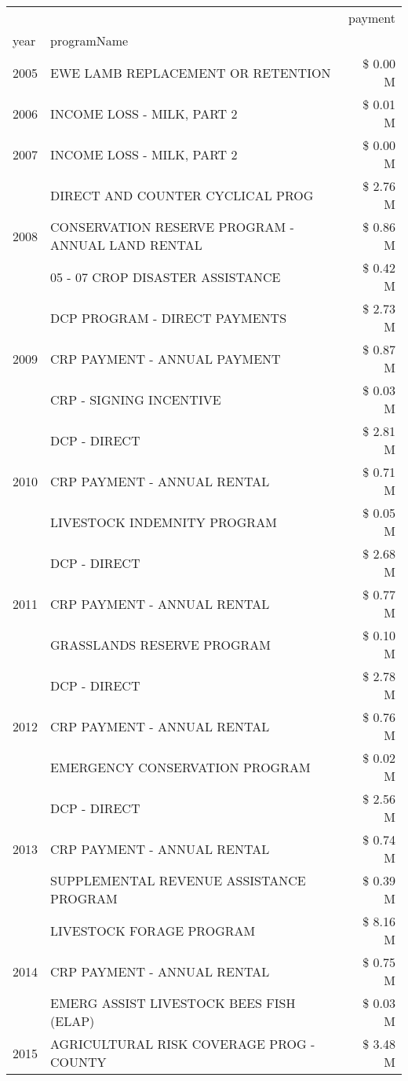 \begin{tabular}{llr}
\toprule
 &  & payment \\
year & programName &  \\
\midrule
2005 & EWE LAMB REPLACEMENT OR RETENTION & \$ 0.00 M \\
\cline{1-3}
2006 & INCOME LOSS - MILK, PART 2 & \$ 0.01 M \\
\cline{1-3}
2007 & INCOME LOSS - MILK, PART 2 & \$ 0.00 M \\
\cline{1-3}
\multirow[t]{3}{*}{2008} & DIRECT AND COUNTER CYCLICAL PROG & \$ 2.76 M \\
 & CONSERVATION RESERVE PROGRAM - ANNUAL LAND RENTAL & \$ 0.86 M \\
 & 05 - 07 CROP DISASTER ASSISTANCE & \$ 0.42 M \\
\cline{1-3}
\multirow[t]{3}{*}{2009} & DCP PROGRAM - DIRECT PAYMENTS & \$ 2.73 M \\
 & CRP PAYMENT - ANNUAL PAYMENT & \$ 0.87 M \\
 & CRP - SIGNING INCENTIVE & \$ 0.03 M \\
\cline{1-3}
\multirow[t]{3}{*}{2010} & DCP - DIRECT & \$ 2.81 M \\
 & CRP PAYMENT - ANNUAL RENTAL & \$ 0.71 M \\
 & LIVESTOCK INDEMNITY PROGRAM & \$ 0.05 M \\
\cline{1-3}
\multirow[t]{3}{*}{2011} & DCP - DIRECT & \$ 2.68 M \\
 & CRP PAYMENT - ANNUAL RENTAL & \$ 0.77 M \\
 & GRASSLANDS RESERVE PROGRAM & \$ 0.10 M \\
\cline{1-3}
\multirow[t]{3}{*}{2012} & DCP - DIRECT & \$ 2.78 M \\
 & CRP PAYMENT - ANNUAL RENTAL & \$ 0.76 M \\
 & EMERGENCY CONSERVATION PROGRAM & \$ 0.02 M \\
\cline{1-3}
\multirow[t]{3}{*}{2013} & DCP - DIRECT & \$ 2.56 M \\
 & CRP PAYMENT - ANNUAL RENTAL & \$ 0.74 M \\
 & SUPPLEMENTAL REVENUE ASSISTANCE PROGRAM & \$ 0.39 M \\
\cline{1-3}
\multirow[t]{3}{*}{2014} & LIVESTOCK FORAGE PROGRAM & \$ 8.16 M \\
 & CRP PAYMENT - ANNUAL RENTAL & \$ 0.75 M \\
 & EMERG ASSIST LIVESTOCK BEES FISH (ELAP) & \$ 0.03 M \\
\cline{1-3}
\multirow[t]{3}{*}{2015} & AGRICULTURAL RISK COVERAGE PROG - COUNTY & \$ 3.48 M \\

\end{tabular}
